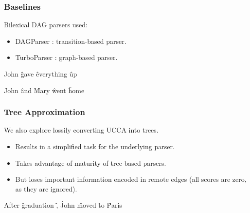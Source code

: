 \documentclass[t]{beamer}
\begin{document}
\begin{frame}
\frametitle{Baselines}
Bilexical DAG parsers used:
\begin{itemize}
 \item DAGParser \cite{ribeyre-villemontedelaclergerie-seddah:2014:SemEval}:
 transition-based parser.
 \item TurboParser \cite{almeida-martins:2015:SemEval}:
 graph-based parser.
\end{itemize}

\vfill
\pause
\begin{center}
	\begin{dependency}[theme = simple]
	\begin{deptext}[column sep=.7em,ampersand replacement=\^]
	John \^ gave \^ everything \^ up \\
	\end{deptext}
	\end{dependency}
	
	\begin{dependency}[theme = simple]
	\begin{deptext}[column sep=.7em,ampersand replacement=\^]
	John \^ and \^ Mary \^ went \^ home \\
	\end{deptext}
	\end{dependency}
\end{center}
\end{frame}


\begin{frame}
\frametitle{Tree Approximation}
We also explore lossily converting UCCA into trees.
\begin{itemize}
 \item Results in a simplified task for the underlying parser.
 \item Takes advantage of maturity of tree-based parsers.
 \item But loses important information encoded in remote edges
   (all scores are zero, as they are ignored).
\end{itemize}

\vfill
\begin{center}
	\begin{dependency}[theme = simple]
	\begin{deptext}[column sep=.7em,ampersand replacement=\^]
	After \^ graduation \^ , \^ John \^ moved \^ to \^ Paris \\
	\end{deptext}
	\end{dependency}
\end{center}
\end{frame}
\end{document}
